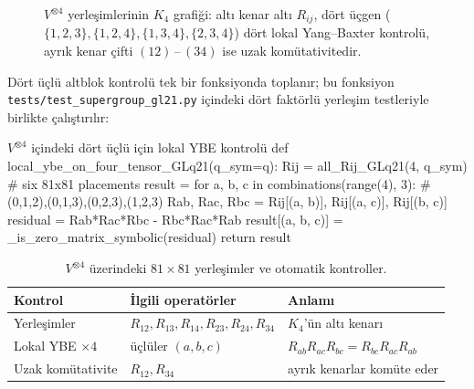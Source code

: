 \documentclass[10pt]{math}
\numberwithin{equation}{section}
\theoremstyle{plain}
\theoremstyle{definition}
\begin{document}
\begin{figure}[h]
\centering
{}
\caption{$V^{\otimes 4}$ yerleşimlerinin $K_4$ grafiği: altı kenar altı $R_{ij}$,
dört üçgen ($\{1,2,3\},\{1,2,4\},\{1,3,4\},\{2,3,4\}$) dört lokal Yang--Baxter
kontrolü, ayrık kenar çifti $(12)\,$--$\,(34)$ ise uzak komütativitedir.}
\label{fig:k4}
\end{figure}

Dört üçlü altblok kontrolü tek bir fonksiyonda toplanır; bu fonksiyon
\texttt{tests/test\_supergroup\_gl21.py} içindeki dört faktörlü yerleşim
testleriyle birlikte çalıştırılır:

\begin{pythoncode}{$V^{\otimes 4}$ içindeki dört üçlü için lokal YBE kontrolü}
def local_ybe_on_four_tensor_GLq21(q_sym=q):
    Rij = all_Rij_GLq21(4, q_sym)          # six 81x81 placements
    result = {}
    for a, b, c in combinations(range(4), 3):   # (0,1,2),(0,1,3),(0,2,3),(1,2,3)
        Rab, Rac, Rbc = Rij[(a, b)], Rij[(a, c)], Rij[(b, c)]
        residual = Rab*Rac*Rbc - Rbc*Rac*Rab
        result[(a, b, c)] = _is_zero_matrix_symbolic(residual)
    return result
\end{pythoncode}

\begin{table}[h]
\centering
\small
\caption{$V^{\otimes 4}$ üzerindeki $81\times 81$ yerleşimler ve otomatik
kontroller.}
\label{tab:vtensor4}
\begin{tabularx}{\textwidth}{@{}l l X@{}}
\toprule
Kontrol & İlgili operatörler & Anlamı \\
\midrule
Yerleşimler & $R_{12},R_{13},R_{14},R_{23},R_{24},R_{34}$ & $K_4$'ün altı kenarı \\
\addlinespace[1pt]
Lokal YBE $\times 4$ & üçlüler $(a,b,c)$ & $R_{ab}R_{ac}R_{bc}=R_{bc}R_{ac}R_{ab}$ \\
\addlinespace[1pt]
Uzak komütativite & $R_{12},R_{34}$ & ayrık kenarlar komüte eder \\
\bottomrule
\end{tabularx}
\end{table}
\end{document}
